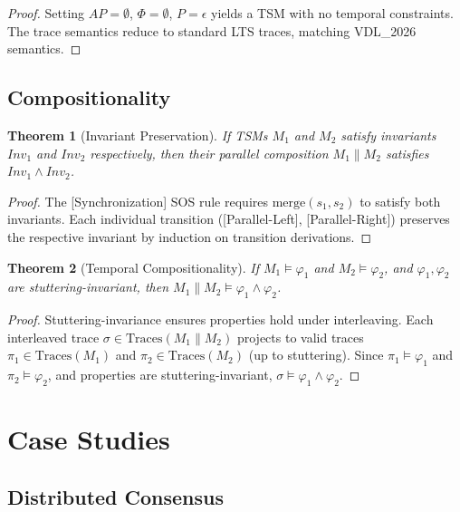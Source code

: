 \documentclass[conference]{IEEEtran}
\newtheorem{theorem}{Theorem}
\begin{document}
\begin{proof}
Setting $AP = \emptyset$, $\Phi = \emptyset$, $P = \epsilon$ yields a TSM with no temporal constraints. The trace semantics reduce to standard LTS traces, matching VDL\_2026 semantics.
\end{proof}

\subsection{Compositionality}

\begin{theorem}[Invariant Preservation]
\label{thm:inv_preservation}
If TSMs $M_1$ and $M_2$ satisfy invariants $Inv_1$ and $Inv_2$ respectively, then their parallel composition $M_1 \parallel M_2$ satisfies $Inv_1 \wedge Inv_2$.
\end{theorem}

\begin{proof}
The [Synchronization] SOS rule requires $\text{merge}(s_1, s_2)$ to satisfy both invariants. Each individual transition ([Parallel-Left], [Parallel-Right]) preserves the respective invariant by induction on transition derivations.
\end{proof}

\begin{theorem}[Temporal Compositionality]
\label{thm:compositionality}
If $M_1 \models \varphi_1$ and $M_2 \models \varphi_2$, and $\varphi_1, \varphi_2$ are stuttering-invariant, then $M_1 \parallel M_2 \models \varphi_1 \wedge \varphi_2$.
\end{theorem}

\begin{proof}
Stuttering-invariance ensures properties hold under interleaving. Each interleaved trace $\sigma \in \text{Traces}(M_1 \parallel M_2)$ projects to valid traces $\pi_1 \in \text{Traces}(M_1)$ and $\pi_2 \in \text{Traces}(M_2)$ (up to stuttering). Since $\pi_1 \models \varphi_1$ and $\pi_2 \models \varphi_2$, and properties are stuttering-invariant, $\sigma \models \varphi_1 \wedge \varphi_2$.
\end{proof}

\section{Case Studies}

\subsection{Distributed Consensus}
\end{document}
